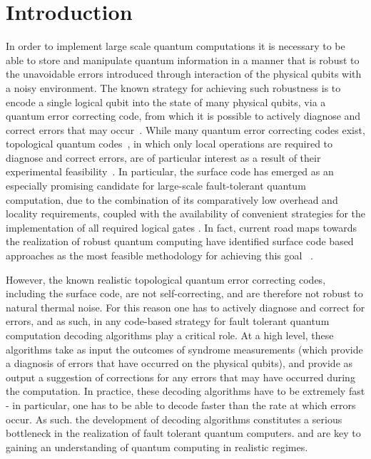 \documentclass[twocolumn,preprintnumbers,amsmath,amssymb,notitlepage,nofootinbib,longbibliography,superscriptaddress,aps,pra,10pt]{revtex4-1}
\begin{document}
\section{Introduction}\label{s:introduction}
	In order to implement large scale quantum computations it is necessary to be able to store and manipulate quantum information in a manner that is robust to the unavoidable errors introduced through interaction of the physical qubits with a noisy environment.
	The known strategy for achieving such robustness is to encode a single logical qubit into the state of many physical qubits, via a quantum error correcting code, from which it is possible to actively diagnose and correct errors that may occur~\cite{Terhal15,Campbell17}.
	While many quantum error correcting codes exist, topological quantum codes~\cite{Kitaev03, Dennis02, Preskill17lectures, Nayak08, Pachos12, Terhal15, Brown16, Campbell17}, in which only local operations are required to diagnose and correct errors, are of particular interest as a result of their experimental feasibility~\cite{Reed12, Barends14, Nigg14, Corcoles15, Albrecht16, Takita16, Linke17}.
	In particular, the surface code has emerged as an especially promising candidate for large-scale fault-tolerant quantum computation, due to the combination of its comparatively low overhead and locality requirements, coupled with the availability of convenient strategies for the implementation of all required logical gates \cite{Fowler18,Litinski18b}. 
	In fact, current road maps towards the realization of robust quantum computing have identified surface code based approaches as the most feasible methodology for achieving this goal ~\cite{Roadmap}.

	However, the known realistic topological quantum error correcting codes, including the surface code, are not self-correcting, and are therefore not robust to natural thermal noise.
	For this reason one has to actively diagnose and correct for errors, and as such, in any code-based strategy for fault tolerant quantum computation decoding algorithms play a critical role.
	At a high level, these algorithms take as input the outcomes of syndrome measurements (which provide a diagnosis of errors that have occurred on the physical qubits), and provide as output a suggestion of corrections for any errors that may have occurred during the computation. 
	In practice, these decoding algorithms have to be extremely fast - in particular, one has to be able to decode faster than the rate at which errors occur.
	As such. the development of decoding algorithms constitutes a serious bottleneck in the realization of fault tolerant quantum computers. and are key to gaining an understanding of quantum computing in realistic regimes.
\end{document}
